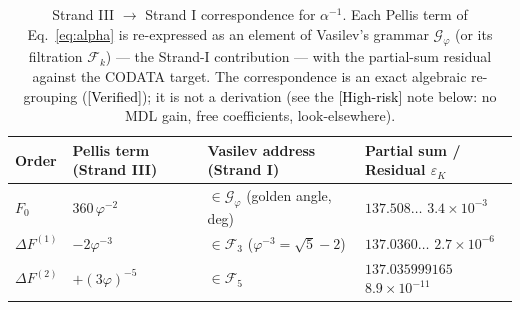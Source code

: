 \documentclass[11pt]{article}
\newcommand{\Verified}{\textcolor{black}{[Verified]}}
\newcommand{\Risk}{\textcolor{black}{[High-risk]}}
\newcommand{\phigr}{\varphi}
\begin{document}
\begin{table}[ht]
\centering
\caption{Strand III $\to$ Strand I correspondence for $\alpha^{-1}$. Each Pellis term of Eq.~\eqref{eq:alpha} is re-expressed as an element of Vasilev's grammar $\mathcal{G}_{\phigr}$ (or its filtration $\mathcal{F}_k$) --- the Strand-I contribution --- with the partial-sum residual against the CODATA target. The correspondence is an exact algebraic re-grouping (\Verified{}); it is not a derivation (see the \Risk{} note below: no MDL gain, free coefficients, look-elsewhere).}
\label{tab:correspondence}
\small
\begin{tabular}{@{}llll@{}}
\toprule
Order & Pellis term (Strand III) & Vasilev address (Strand I) & Partial sum / Residual $\varepsilon_K$ \\
\midrule
$F_0$ & $360\,\phigr^{-2}$ & $\in \mathcal{G}_{\phigr}$ (golden angle, deg) & $137.508\dots$ \quad $3.4 \times 10^{-3}$ \\
$\Delta F^{(1)}$ & $-2\phigr^{-3}$ & $\in \mathcal{F}_3$ ($\phigr^{-3} = \sqrt{5}-2$) & $137.0360\dots$ \quad $2.7 \times 10^{-6}$ \\
$\Delta F^{(2)}$ & $+(3\phigr)^{-5}$ & $\in \mathcal{F}_5$ & $137.035999165$ \quad $8.9 \times 10^{-11}$ \\
\bottomrule
\end{tabular}
\end{table}
\end{document}
